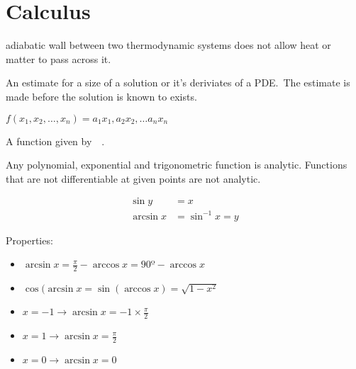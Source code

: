 \section{Calculus}

\begin{definition}[Adiabatic]
    adiabatic wall between two thermodynamic systems does not allow heat or
    matter to pass across it. 

\end{definition}

\begin{definition}
    An estimate for a size of a solution or it's deriviates of a PDE.\
    The estimate is made before the solution is known to exists.

\end{definition}

\begin{definition}[Affine]
    $ 
    f(x_{1}, x_{2}, \dots, x_{n}) = 
    a_{1}x_{1}, a_{2}x_{2}, \dots a_{n}x_{n}
    $
\end{definition}

\begin{definition}
    A function given by~~.
    
    Any polynomial, exponential and trigonometric function is analytic.
    Functions that are not differentiable at given points are not analytic.

\end{definition}

\begin{definition}[arcsin]
    \begin{align*}
        \sin{y} &= x \\
        \arcsin{x} &= \sin^{-1}{x} = y
    \end{align*}

    Properties:
    \begin{itemize}
        \item $\arcsin{x} = \frac{\pi}{2} - \arccos{x} = 90º - \arccos{x}$
        \item $\cos{(\arcsin{x}} = \sin{(\arccos{x})} = \sqrt{1-x^{2}}{}$
        \item $ x = -1 \rightarrow \arcsin{x} = -1\times\frac{\pi}{2}$
        \item $ x = 1 \rightarrow \arcsin{x} = \frac{\pi}{2}$
        \item $ x = 0 \rightarrow \arcsin{x} = 0$
    \end{itemize}
\end{definition}

